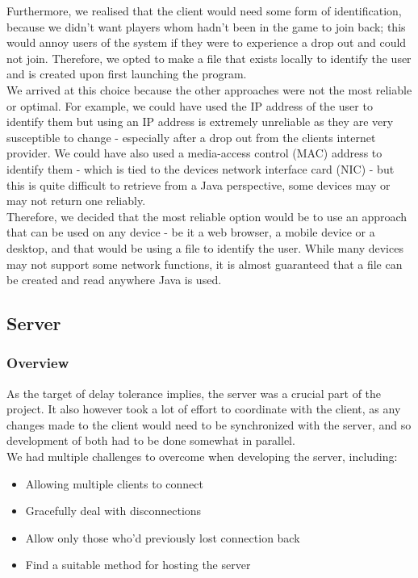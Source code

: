 \documentclass[11pt]{article}
\begin{document}
Furthermore, we realised that the client would need some form of identification, because we didn't want players whom hadn't been in the game to join back; this would annoy users of the system if they were to experience a drop out and could not join. Therefore, we opted to make a file that exists locally to identify the user and is created upon first launching the program. \\

We arrived at this choice because the other approaches were not the most reliable or optimal. For example, we could have used the IP address of the user to identify them but using an IP address is extremely unreliable as they are very susceptible to change - especially after a drop out from the clients internet provider. We could have also used a media-access control (MAC) address to identify them - which is tied to the devices network interface card (NIC) - but this is quite difficult to retrieve from a Java perspective, some devices may or may not return one reliably. \\

Therefore, we decided that the most reliable option would be to use an approach that can be used on any device - be it a web browser, a mobile device or a desktop, and that would be using a file to identify the user. While many devices may not support some network functions, it is almost guaranteed that a file can be created and read anywhere Java is used. 

\newpage
\subsection{Server}
\subsubsection{Overview}
As the target of delay tolerance implies, the server was a crucial part of the project. It also however took a lot of effort to coordinate with the client, as any changes made to the client would need to be synchronized with the server, and so development of both had to be done somewhat in parallel. \\

We had multiple challenges to overcome when developing the server, including: \\

\begin{itemize}
	\item Allowing multiple clients to connect
	\item Gracefully deal with disconnections
	\item Allow only those who'd previously lost connection back
	\item Find a suitable method for hosting the server
\end{itemize}
\end{document}
